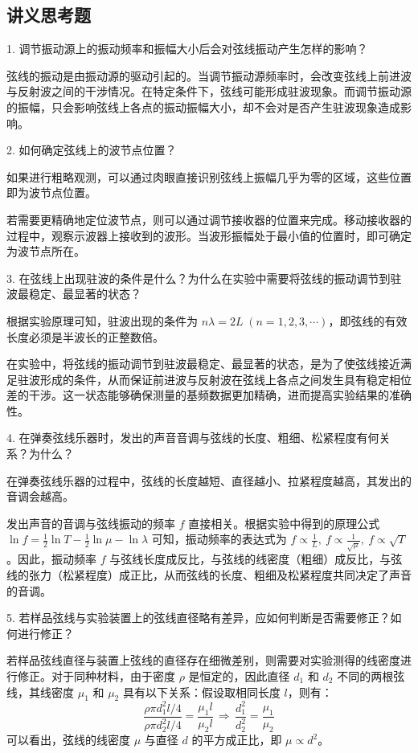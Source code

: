\documentclass[UTF-8,twoside,cs4size]{ctexart}
\begin{document}
\subsection{讲义思考题}
1. 调节振动源上的振动频率和振幅大小后会对弦线振动产生怎样的影响？

{\kaishu 弦线的振动是由振动源的驱动引起的。当调节振动源频率时，会改变弦线上前进波与反射波之间的干涉情况。在特定条件下，弦线可能形成驻波现象。而调节振动源的振幅，只会影响弦线上各点的振动振幅大小，却不会对是否产生驻波现象造成影响。}


2. 如何确定弦线上的波节点位置？

{\kaishu 如果进行粗略观测，可以通过肉眼直接识别弦线上振幅几乎为零的区域，这些位置即为波节点位置。}

{\kaishu 若需要更精确地定位波节点，则可以通过调节接收器的位置来完成。移动接收器的过程中，观察示波器上接收到的波形。当波形振幅处于最小值的位置时，即可确定为波节点所在。}

3. 在弦线上出现驻波的条件是什么？为什么在实验中需要将弦线的振动调节到驻波最稳定、最显著的状态？

{\kaishu 根据实验原理可知，驻波出现的条件为 $n\lambda = 2L\;(n=1,2,3,\cdots)$，即弦线的有效长度必须是半波长的正整数倍。}

{\kaishu 在实验中，将弦线的振动调节到驻波最稳定、最显著的状态，是为了使弦线接近满足驻波形成的条件，从而保证前进波与反射波在弦线上各点之间发生具有稳定相位差的干涉。这一状态能够确保测量的基频数据更加精确，进而提高实验结果的准确性。}

4. 在弹奏弦线乐器时，发出的声音音调与弦线的长度、粗细、松紧程度有何关系？为什么？

{\kaishu 在弹奏弦线乐器的过程中，弦线的长度越短、直径越小、拉紧程度越高，其发出的音调会越高。}

{\kaishu 发出声音的音调与弦线振动的频率 $f$ 直接相关。根据实验中得到的原理公式 $\ln f = \frac{1}{2}\ln T - \frac{1}{2}\ln \mu - \ln \lambda$ 可知，振动频率的表达式为 $ f \propto \frac{1}{L},~f \propto \frac{1}{\sqrt{\mu}},~f \propto \sqrt{T} $。因此，振动频率 $f$ 与弦线长度成反比，与弦线的线密度（粗细）成反比，与弦线的张力（松紧程度）成正比，从而弦线的长度、粗细及松紧程度共同决定了声音的音调。}

5. 若样品弦线与实验装置上的弦线直径略有差异，应如何判断是否需要修正？如何进行修正？

{\kaishu 若样品弦线直径与装置上弦线的直径存在细微差别，则需要对实验测得的线密度进行修正。对于同种材料，由于密度 $\rho$ 是恒定的，因此直径 $d_1$ 和 $d_2$ 不同的两根弦线，其线密度 $\mu_1$ 和 $\mu_2$ 具有以下关系：假设取相同长度 $l$，则有：}
\[
\frac{\rho \pi d_1^2 l / 4}{\rho \pi d_2^2 l / 4} = \frac{\mu_1 l}{\mu_2 l} \,\Longrightarrow\, \frac{d_1^2}{d_2^2} = \frac{\mu_1}{\mu_2}
\]
{\kaishu 可以看出，弦线的线密度 $\mu$ 与直径 $d$ 的平方成正比，即 $\mu \propto d^2$。}
\end{document}
